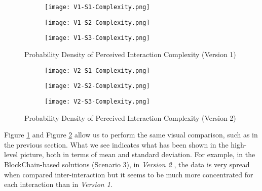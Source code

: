 \begin{figure}[htb]
    \centering
    \begin{subfigure}[b]{0.49\textwidth}
        \centering
        \texttt{[image: V1-S1-Complexity.png]}
    \end{subfigure}
    \begin{subfigure}[b]{0.49\textwidth}
        \centering
        \texttt{[image: V1-S2-Complexity.png]}
    \end{subfigure}
    \hfill
    \begin{subfigure}[b]{0.49\textwidth}
        \centering
        \texttt{[image: V1-S3-Complexity.png]}
    \end{subfigure}
    
    \caption{Probability Density of Perceived Interaction Complexity (Version 1)}
    \label{fig: perceivedInteractionComplexityOne}    
\end{figure}

\begin{figure}[htb]
    \centering
    \begin{subfigure}[b]{0.49\textwidth}
        \centering
        \texttt{[image: V2-S1-Complexity.png]}
    \end{subfigure}
    \begin{subfigure}[b]{0.49\textwidth}
        \centering
        \texttt{[image: V2-S2-Complexity.png]}
    \end{subfigure}
    \hfill
    \begin{subfigure}[b]{0.49\textwidth}
        \centering
        \texttt{[image: V2-S3-Complexity.png]}
    \end{subfigure}
    
    \caption{Probability Density of Perceived Interaction Complexity (Version 2)}
    \label{fig: perceivedInteractionComplexityTwo}   
\end{figure}

Figure \ref{fig: perceivedInteractionComplexityOne} and Figure \ref{fig: perceivedInteractionComplexityTwo} allow us to perform the same visual comparison, such as in the previous section. What we see indicates what has been shown in the high-level picture, both in terms of mean and standard deviation. For example, in the BlockChain-based solutions (Scenario 3), in \textit{Version 2} , the data is very spread when compared inter-interaction but it seems to be much more concentrated for each interaction than in \textit{Version 1}.
  
